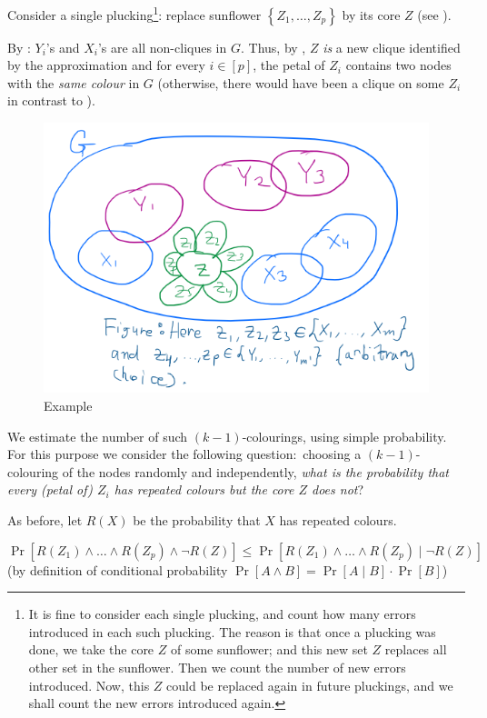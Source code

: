 Consider a single plucking\footnote{It is fine to consider each single plucking, and count how many errors introduced in each such plucking. The reason is that once a plucking was done, we take the core $Z$ of some sunflower; and this new set $Z$ replaces all other set in the sunflower. Then we count the number of new errors introduced. Now, this $Z$ could  be replaced again in future pluckings, and we shall count the new errors introduced again.}: 
replace sunflower $\left\{Z_1, \ldots, Z_p\right\}$ by its core $Z$ (see ).

By : $Y_i$'s and $X_i$'s are all non-cliques in $G$.
Thus, by , $Z$ \emph{is} a new  clique
identified by the approximation and for every $i\in[p]$, the petal of $Z_i$ contains two nodes with the \emph{same colour} in $G$ (otherwise, there would have been a clique on some $Z_i$ in contrast to ).

\begin{figure}[H]
    \centering
    \includegraphics[width=.6\linewidth]{images/clique3.png}
    \caption{Example}
    \label{fig:pluck-stage}
\end{figure}


We estimate the number of such $(k-1)$-colourings, using simple probability.
For this purpose we consider the following question:\ choosing a $(k-1)$-colouring of the nodes randomly and independently, \emph{what is the probability that every (petal of) $Z_i$ has repeated colours but the core $Z$ does not}?

As before, let $R(X)$ be the probability that $X$ has repeated colours.


$$
\operatorname{Pr}
\left[R\left(Z_1\right) \wedge 
\ldots \wedge R\left(Z_p\right) \wedge \neg R(Z)
\right] 
\leq \operatorname{Pr}\left[R\left(Z_1\right) \wedge \ldots \wedge R\left(Z_p\right) \mid \neg R(Z)\right]$$
(by definition of conditional probability $\operatorname{Pr}[A \land B]=\operatorname{Pr}[A \mid B] \cdot \operatorname{Pr}[B]$)

